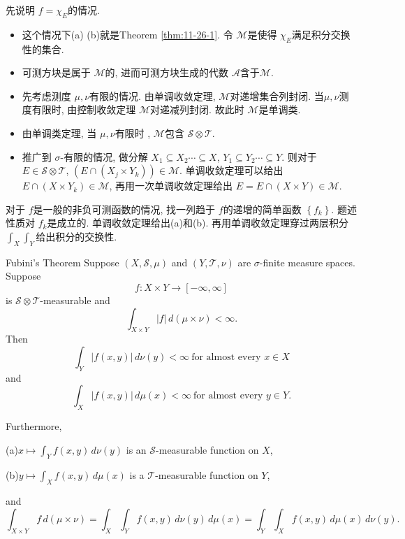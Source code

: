 \documentclass[../main.tex]{subfiles}
\begin{document}
\begin{proofsketch}
  先说明 \(  f= \chi _{E}  \)的情况.
  
  \begin{itemize}
    \item  这个情况下(a) (b)就是Theorem \ref{thm:11-26-1}. 令 \(  \mathcal{M}  \)是使得 \(  \chi _{E}  \)满足积分交换性的集合.
    \item 可测方块是属于 \(  \mathcal{M}  \)的, 进而可测方块生成的代数 \(  \mathcal{A}  \)含于\(  \mathcal{M}  \).   
    \item 先考虑测度 \(  \mu ,\nu   \)有限的情况. 由单调收敛定理, \(  \mathcal{M}  \)对递增集合列封闭. 当\(  \mu ,\nu   \)测度有限时, 由控制收敛定理 \(  \mathcal{M}  \)对递减列封闭.   故此时 \(  \mathcal{M}  \)是单调类.
    \item 由单调类定理, 当 \(  \mu ,\nu   \)有限时   , \(  \mathcal{M}  \)包含 \(  \mathcal{S}\otimes \mathcal{T}  \).
    \item 推广到 \(   \sigma   \)-有限的情况, 做分解 \(  X_1\subseteq X_2\cdots \subseteq X  \), \(  Y_1\subseteq Y_2\cdots \subseteq Y  \). 则对于 \(  E\in \mathcal{S}\otimes \mathcal{T}  \), \(\left(   E\cap  \left( X_{j}\times Y_{k} \right)  \right)\in \mathcal{M}   \). 单调收敛定理可以给出 \(  E\cap \left( X\times Y_{k} \right)\in \mathcal{M}   \), 再用一次单调收敛定理给出 \(  E= E\cap \left( X\times Y \right)\in \mathcal{M}   \).         
  \end{itemize}
  对于 \(  f  \)是一般的非负可测函数的情况, 找一列趋于 \(  f  \)的递增的简单函数 \(  \left\{ f_{k} \right\}  \). 题述性质对 \(  f_{k}  \)是成立的.  单调收敛定理给出(a)和(b). 再用单调收敛定理穿过两层积分 \(  \int _{X} \int_{Y}  \)给出积分的交换性. 
\end{proofsketch}

\begin{theorem}{Fubini's Theorem}{}
Suppose \((X,\mathcal{S},\mu)\) and \((Y,\mathcal{T},\nu)\) are \(\sigma\)-finite measure spaces. Suppose 
\[
f:X\times Y\to[-\infty,\infty]
\]
is \(\mathcal{S}\otimes\mathcal{T}\)-measurable and 
\[
\int_{X\times Y}\lvert f\rvert\,d(\mu\times\nu)<\infty.
\]
Then
\[
\int_Y\lvert f(x,y)\rvert\,d\nu(y)<\infty\ \text{for almost every }x\in X
\]
and
\[
\int_X\lvert f(x,y)\rvert\,d\mu(x)<\infty\ \text{for almost every }y\in Y.
\]

Furthermore,

(a)\quad \(x\mapsto\displaystyle\int_Y f(x,y)\,d\nu(y)\) is an \(\mathcal{S}\)-measurable function on \(X\),

(b)\quad \(y\mapsto\displaystyle\int_X f(x,y)\,d\mu(x)\) is a \(\mathcal{T}\)-measurable function on \(Y\),

and
\[
\int_{X\times Y}f\,d(\mu\times\nu)
=\int_X\int_Y f(x,y)\,d\nu(y)\,d\mu(x)
=\int_Y\int_X f(x,y)\,d\mu(x)\,d\nu(y).
\]
\end{theorem}
\end{document}

